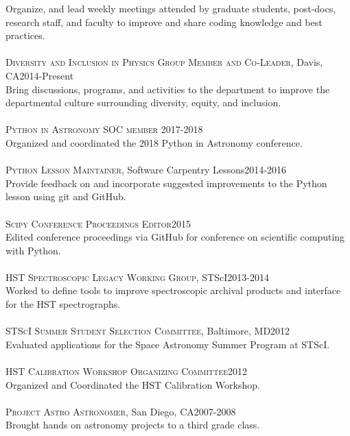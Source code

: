 \documentclass[10pt]{cv}
\begin{document}
\begin{llist}
Organize, and lead weekly meetings attended by graduate students, post-docs, research staff, and faculty to improve and share coding knowledge and best practices.\\
\\
\newpage
\textsc{Diversity and Inclusion in Physics Group Member and Co-Leader}, Davis, CA\hfill 2014-Present\\
Bring discussions, programs, and activities to the department to improve the departmental culture surrounding diversity, equity, and inclusion.\\
%
\\
\textsc{Python in Astronomy SOC member} \hfill 2017-2018\\
Organized and coordinated the 2018 Python in Astronomy conference.\\
\\
\textsc{Python Lesson Maintainer}, Software Carpentry Lessons\hfill 2014-2016\\
Provide feedback on and incorporate suggested improvements to the Python lesson using git and GitHub.\\
\\
\textsc{Scipy Conference Proceedings Editor}\hfill 2015\\
Edited conference proceedings via GitHub for conference on scientific computing with Python.\\
\\
\textsc{HST Spectroscopic Legacy Working Group}, STScI\hfill2013-2014\\
Worked to define tools to improve spectroscopic archival products and interface for the HST spectrographs.\\
\\
\textsc{STScI Summer Student Selection Committee}, Baltimore, MD\hfill2012\\
Evaluated applications for the Space Astronomy Summer Program at STScI.\\
\\
\textsc{HST Calibration Workshop Organizing Committee}\hfill 2012\\
Organized and Coordinated the HST Calibration Workshop.\\
\\
\textsc{Project Astro Astronomer}, San Diego, CA\hfill 2007-2008\\
Brought hands on astronomy projects to a third grade class.\\

\end{llist}
\end{document}
